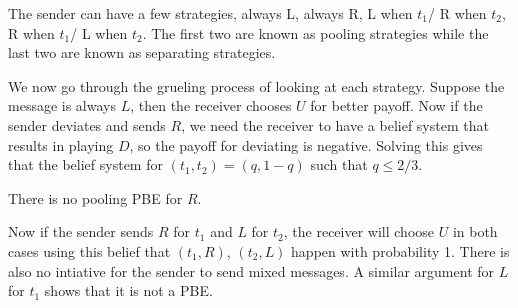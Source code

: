 The sender can have a few strategies, always L, always R, L when $t_1$/ R when $t_2$, R when $t_1$/ L when $t_2$. The first two are known as pooling strategies while the last two are known as separating strategies.

We now go through the grueling process of looking at each strategy.
Suppose the message is always $L$, then the receiver chooses $U$ for better payoff. Now if the sender deviates and sends $R$, we need the receiver to have a belief system that results in playing $D$, so the payoff for deviating is negative. Solving this gives that the belief system for $(t_1,t_2) = (q,1-q)$ such that $q\leq 2/3$.


There is no pooling PBE for $R$.


Now if the sender sends $R$ for $t_1$ and $L$ for $t_2$, the receiver will choose $U$ in both cases using this belief that $(t_1,R)$, $(t_2,L)$ happen with probability 1. There is also no intiative for the sender to send mixed messages. A similar argument for $L$ for $t_1$ shows that it is not a PBE.

